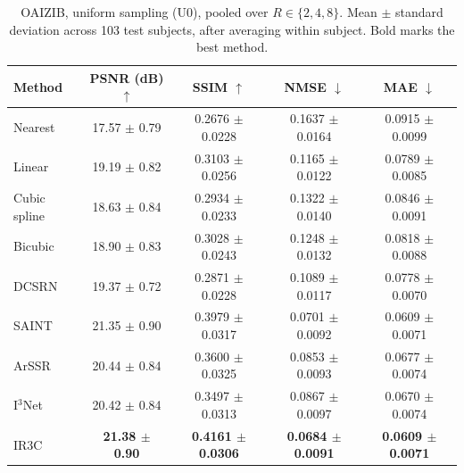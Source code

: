 \begin{table}[pos=!htbp]
\caption{OAIZIB, uniform sampling (U0), pooled over $R\in\{2,4,8\}$. Mean $\pm$ standard deviation across 103 test subjects, after averaging within subject. Bold marks the best method.}
\label{tab:detail-oaizib}
\small
\begin{tabular*}{\textwidth}{@{\extracolsep{\fill}}lcccc@{}}
\toprule
Method & PSNR (dB) $\uparrow$ & SSIM $\uparrow$ & NMSE $\downarrow$ & MAE $\downarrow$ \\
\midrule
Nearest & 17.57 $\pm$ 0.79 & 0.2676 $\pm$ 0.0228 & 0.1637 $\pm$ 0.0164 & 0.0915 $\pm$ 0.0099 \\
Linear & 19.19 $\pm$ 0.82 & 0.3103 $\pm$ 0.0256 & 0.1165 $\pm$ 0.0122 & 0.0789 $\pm$ 0.0085 \\
Cubic spline & 18.63 $\pm$ 0.84 & 0.2934 $\pm$ 0.0233 & 0.1322 $\pm$ 0.0140 & 0.0846 $\pm$ 0.0091 \\
Bicubic & 18.90 $\pm$ 0.83 & 0.3028 $\pm$ 0.0243 & 0.1248 $\pm$ 0.0132 & 0.0818 $\pm$ 0.0088 \\
DCSRN & 19.37 $\pm$ 0.72 & 0.2871 $\pm$ 0.0228 & 0.1089 $\pm$ 0.0117 & 0.0778 $\pm$ 0.0070 \\
SAINT & 21.35 $\pm$ 0.90 & 0.3979 $\pm$ 0.0317 & 0.0701 $\pm$ 0.0092 & 0.0609 $\pm$ 0.0071 \\
ArSSR & 20.44 $\pm$ 0.84 & 0.3600 $\pm$ 0.0325 & 0.0853 $\pm$ 0.0093 & 0.0677 $\pm$ 0.0074 \\
I$^3$Net & 20.42 $\pm$ 0.84 & 0.3497 $\pm$ 0.0313 & 0.0867 $\pm$ 0.0097 & 0.0670 $\pm$ 0.0074 \\
IR3C & \textbf{21.38 $\pm$ 0.90} & \textbf{0.4161 $\pm$ 0.0306} & \textbf{0.0684 $\pm$ 0.0091} & \textbf{0.0609 $\pm$ 0.0071} \\
\bottomrule
\end{tabular*}
\end{table}

